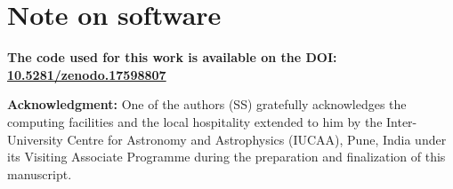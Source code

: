 \documentclass[linenumbers, twocolumn]{aastex701}
\begin{document}








\section*{Note on software}
\textbf{
The code used for this work is available on the DOI:\hfil\break
\href{https://doi.org/10.5281/zenodo.17598807}{10.5281/zenodo.17598807}}

\begin{acknowledgements}
\textbf{Acknowledgment:} One of the authors (SS) gratefully acknowledges the computing facilities and the local hospitality extended to him by the Inter-University Centre for Astronomy and Astrophysics (IUCAA), Pune, India under its Visiting Associate Programme during the preparation and finalization of this manuscript.
\end{acknowledgements}



\end{document}
